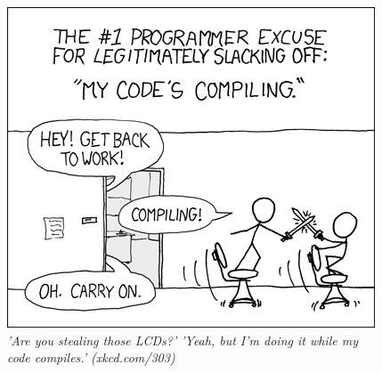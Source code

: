 \vfill

\begin{figure}[h!]
\centering
\includegraphics[scale=.5]{img/xkcd/compiling.png}
\caption*{{\small \textit{'Are you stealing those LCDs?' 'Yeah, but I'm doing it while my code compiles.' (xkcd.com/303)}}}
\end{figure}

